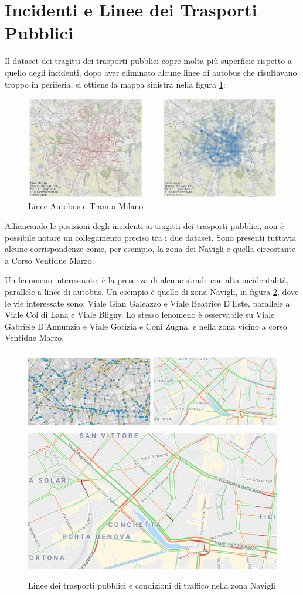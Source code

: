 \documentclass[a4paper,12pt]{report}
\begin{document}
\section{Incidenti e Linee dei Trasporti Pubblici}

Il dataset dei tragitti dei trasporti pubblici copre molta più superficie rispetto a 
quello degli incidenti, dopo aver eliminato alcune linee di autobus che risultavano 
troppo in periferia, si ottiene la mappa sinistra nella figura \ref{fig:geo-trasporti}: 

\begin{figure}
    \hfill\includegraphics[width=0.6\linewidth]{../src/atm/linee_atm.png}\hspace*{\fill}
    \caption{Linee Autobus e Tram a Milano}
    \label{fig:geo-trasporti}
\end{figure}

Affiancando le posizioni degli incidenti ai tragitti dei trasporti pubblici, 
non è possibile notare un collegamento preciso tra i due dataset. 
Sono presenti tuttavia alcune corrispondenze come, per esempio, la zona dei Navigli 
e quella circostante a Corso Ventidue Marzo. 

Un fenomeno interessante, è la presenza di alcune strade con alta incidentalità, 
parallele a linee di autobus. 
Un esempio è quello di zona Navigli, in figura \ref{fig:navigli}, dove le vie interessate sono:
Viale Gian Galeazzo e Viale Beatrice D'Este, parallele a Viale Col di Lana e Viale Bligny.
Lo stesso fenomeno è osservabile su Viale Gabriele D'Annunzio e Viale Gorizia e Coni Zugna, 
e nella zona vicino a corso Ventidue Marzo.

\begin{figure}
    \includegraphics[width=0.51\linewidth]{../src/atm/navigli.png}
    \includegraphics[width=0.49\linewidth]{img/navigli.png}
    \caption{Linee dei trasporti pubblici e condizioni di traffico nella zona Navigli}
    \label{fig:navigli}
\end{figure}
\end{document}
